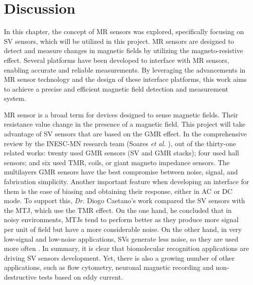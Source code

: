 \section{Discussion}

In this chapter, the concept of \ac{MR} sensors was explored, specifically focusing on \ac{SV} sensors, which will be utilized in this project. \ac{MR} sensors are designed to detect and measure changes in magnetic fields by utilizing the magneto-resistive effect. Several platforms have been developed to interface with \ac{MR} sensors, enabling accurate and reliable measurements. By leveraging the advancements in \ac{MR} sensor technology and the design of these interface platforms, this work aims to achieve a precise and efficient magnetic field detection and measurement system.

\ac{MR} sensor is a broad term for devices designed to sense magnetic fields. Their resistance value change in the presence of a magnetic field. This project will take advantage of \ac{SV} sensors that are based on the \ac{GMR} effect. In the comprehensive review by the \ac{INESC-MN} research team (Soares \textit{et al.} \cite{Soares2019}), out of the thirty-one related works: twenty used \ac{GMR} sensors (\ac{SV} and \ac{GMR} stacks); four used hall sensors; and six used \ac{TMR}, coils, or giant magneto impedance sensors. The multilayers \ac{GMR} sensors have the best compromise between noise, signal, and fabrication simplicity. Another important feature when developing an interface for them is the ease of biasing and obtaining their response, either in \ac{AC} or \ac{DC} mode. To support this, \textit{Dr.} Diogo Caetano's work \cite{DiogoC_thesis} compared the \ac{SV} sensors with the \ac{MTJ}, which use the \ac{TMR} effect. On the one hand, he concluded that in noisy environments, \ac{MTJ}s tend to perform better \cite{s120912169, 8526523, ECNDT2014, sergeeva} as they produce more signal per unit of field but have a more considerable noise. On the other hand, in very low-signal and low-noise applications, \ac{SV}s generate less noise, so they are used more often \cite{Freitas2017SpintronicBF, C0LC00324G, Soares2019, 8379352, j.bios.2018.02.046}. In summary, it is clear that biomolecular recognition applications are driving \ac{SV} sensors development. Yet, there is also a growing number of other applications, such as flow cytometry, neuronal magnetic recording and non-destructive tests based on eddy current.

